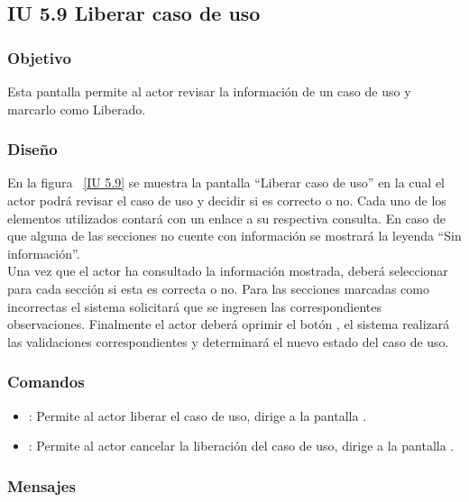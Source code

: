 \newpage 
\subsection{IU 5.9 Liberar caso de uso}

\subsubsection{Objetivo}
	
	Esta pantalla permite al actor revisar la información de un caso de uso y marcarlo como Liberado.

\subsubsection{Diseño}

    En la figura ~\ref{IU 5.9} se muestra la pantalla ``Liberar caso de uso'' en la cual el actor podrá revisar el caso de uso y decidir si es correcto o no. Cada uno de los elementos utilizados contará con un enlace a su respectiva consulta. En caso de que alguna de las secciones no cuente con información se mostrará la leyenda ``Sin información''. \\
	
	Una vez que el actor ha consultado la información mostrada, deberá seleccionar para cada sección si esta es correcta o no. Para las secciones marcadas como incorrectas el sistema solicitará que se ingresen las correspondientes observaciones. Finalmente el actor deberá oprimir el botón , el sistema realizará las validaciones correspondientes y determinará el nuevo estado del caso de uso.


\subsubsection{Comandos}
\begin{itemize}
	\item {}: Permite al actor liberar el caso de uso, dirige a la pantalla .
	\item {}: Permite al actor cancelar la liberación del caso de uso, dirige a la pantalla .
\end{itemize}

\subsubsection{Mensajes}
	
